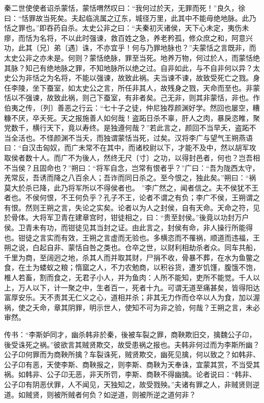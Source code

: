 \documentclass[]{article}
\begin{document}
秦二世使使者诏杀蒙恬，蒙恬喟然叹曰：``我何过於天，无罪而死！''良久，徐曰：``恬罪故当死矣。夫起临洮属之辽东，城径万里，此其中不能毋绝地脉。此乃恬之罪也。''即吞药自杀。太史公非之曰：``夫秦初灭诸侯，天下心未定，夷伤未瘳，而恬为名将，不以此时强谏，救百姓之急，养老矜孤，修众庶之和，阿意兴功，此其〔兄〕弟〔遇〕诛，不亦宜乎！何与乃罪地脉也？''夫蒙恬之言既非，而太史公非之亦未是。何则？蒙恬绝脉，罪至当死。地养万物，何过於人，而蒙恬绝其脉？知己有绝地脉之罪，不知地脉所以绝之过。自非如此，与不自非何以异？太史公为非恬之为名将，不能以强谏，故致此祸。夫当谏不谏，故致受死亡之戮。身任李陵，坐下蚕室，如太史公之言，所任非其人，故残身之戮，天命而至也。非蒙恬以不强谏，故致此祸，则己下蚕室，有非者矣。己无非，则其非蒙恬，非也。作伯夷之传，〔列〕善恶之行云：``七十子之徒，仲尼独荐颜渊好学。然回也屡空，糟糠不厌，卒夭死。天之报施善人如何哉！盗跖日杀不辜，肝人之肉，暴戾恣睢，聚党数千，横行天下，竟以寿终。是独遵何哉？''若此言之，颜回不当早夭，盗跖不当全活也。不怪颜渊不当夭，而独谓蒙恬当死，过矣。汉将李广与望气王朔燕语曰：``自汉击匈奴，而广未常不在其中，而诸校尉以下，才能不及中，然以胡军攻取侯者数十人。而广不为後人，然终无尺〔寸〕之功，以得封邑者，何也？岂吾相不当侯？且固命也？''朔曰：``将军自念，岂常有恨者乎？''广曰：``吾为陇西太守，羌常反，吾诱而降之八百余人；吾诈而同日杀之。至今恨之，独此矣。''朔曰：``祸莫大於杀已降，此乃将军所以不得侯者也。
''李广然之，闻者信之。夫不侯犹不王者也。不侯何恨，不王何负乎？孔子不王，论者不谓之有负；李广不侯，王朔谓之有恨。然则王朔之言，失论之实矣。论者以为人之封侯，自有天命。天命之符，见於骨体。大将军卫青在建章宫时，钳徒相之，曰：``贵至封侯。''後竟以功封万户侯。卫青未有功，而钳徒见其当封之证。由此言之，封侯有命，非人操行所能得也。钳徒之言实而有效，王朔之言虚而无验也。多横恣而不罹祸，顺道而违福，王朔之说，白起自非、蒙恬自咎之类也。仓卒之世，以财利相劫杀者众。同车共船，千里为商，至阔迥之地，杀其人而并取其财，尸捐不收，骨暴不葬，在水为鱼鳖之食，在土为蝼蚁之粮；惰窳之人，不力农勉商，以积谷货，遭岁饥馑，腹饿不饱，椎人若畜，割而食之，无君子小人，并为鱼肉：人所不能知，吏所不能觉。千人以上，万人以下，计一聚之中，生者百一，死者十九。可谓无道至痛甚矣，皆得阳达富厚安乐。天不责其无仁义之心，道相并杀；非其无力作而仓卒以人为食，加以渥祸，使之夭命，章其阴罪，明示世人，使知不可为非之验，何哉？王朔之言，未必审然。

传书：``李斯妒同才，幽杀韩非於秦，後被车裂之罪，商鞅欺旧交，擒魏公子卬，後受诛死之祸。''彼欲言其贼贤欺交，故受患祸之报也。夫韩非何过而为李斯所幽？公子卬何罪而为商鞅所擒？车裂诛死，贼贤欺交，幽死见擒，何以致之？如韩非、公子卬有恶，天使李斯、商鞅报之，则李斯、商鞅为天奉诛，宜蒙其赏，不当受其祸。如韩非、公子卬无恶，非天所罚，李斯、商鞅不得幽擒。论者说曰：``韩非、公子卬有阴恶伏罪，人不闻见，天独知之，故受戮殃。''夫诸有罪之人，非贼贤则逆道。如贼贤，则被所贼者何负？如逆道，则被所逆之道何非？
\end{document}

